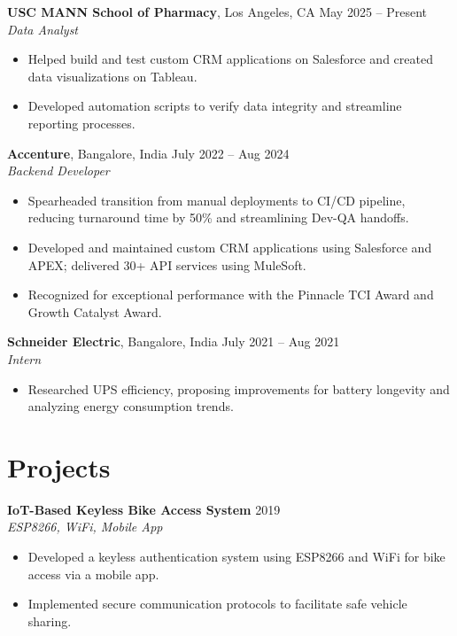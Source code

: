 \documentclass[letterpaper,10pt]{article}
\begin{document}
\textbf{USC MANN School of Pharmacy}, Los Angeles, CA \hfill May 2025 -- Present \\
\textit{Data Analyst}
\begin{itemize}
    \item Helped build and test custom CRM applications on Salesforce and created data visualizations on Tableau.
    \item Developed automation scripts to verify data integrity and streamline reporting processes.
\end{itemize}

\textbf{Accenture}, Bangalore, India \hfill July 2022 -- Aug 2024 \\
\textit{Backend Developer}
\begin{itemize}
    \item Spearheaded transition from manual deployments to CI/CD pipeline, reducing turnaround time by 50\% and streamlining Dev-QA handoffs.
    \item Developed and maintained custom CRM applications using Salesforce and APEX; delivered 30+ API services using MuleSoft.
    \item Recognized for exceptional performance with the Pinnacle TCI Award and Growth Catalyst Award.
\end{itemize}

\textbf{Schneider Electric}, Bangalore, India \hfill July 2021 -- Aug 2021 \\
\textit{Intern}
\begin{itemize}
    \item Researched UPS efficiency, proposing improvements for battery longevity and analyzing energy consumption trends.
\end{itemize}

\section*{Projects}
\textbf{IoT-Based Keyless Bike Access System} \hfill 2019 \\
\textit{ESP8266, WiFi, Mobile App}
\begin{itemize}
    \item Developed a keyless authentication system using ESP8266 and WiFi for bike access via a mobile app.
    \item Implemented secure communication protocols to facilitate safe vehicle sharing.
\end{itemize}
\end{document}
